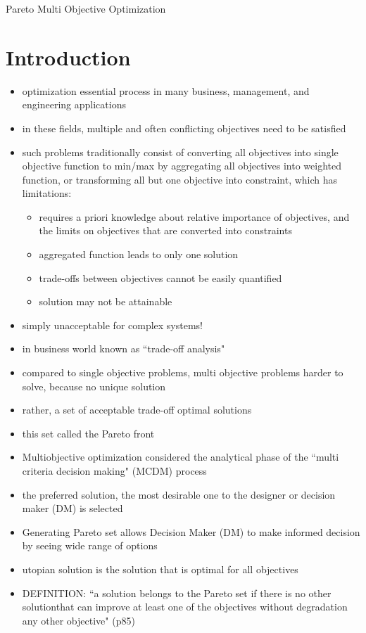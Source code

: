 \documentclass{article}
\begin{document}
\newpage
%
%
%
%
% 
%
%
%
{\LARGE Pareto Multi Objective Optimization}
\setcounter{section}{0}
\section{Introduction}
\begin{itemize}
\item optimization essential process in many business, management, and engineering applications
\item in these fields, multiple and often conflicting objectives need to be satisfied
\item such problems traditionally consist of converting all objectives into single objective function to min/max by aggregating all objectives into weighted function, or transforming all but one objective into constraint, which has limitations:
	\begin{itemize}
	\item requires a priori knowledge about relative importance of objectives, and the limits on objectives that are converted into constraints
	\item aggregated function leads to only one solution
	\item trade-offs between objectives cannot be easily quantified
	\item solution may not be attainable 
	\end{itemize}
\item simply unacceptable for complex systems!
\item in business world known as ``trade-off analysis"
\item compared to single objective problems, multi objective problems harder to solve, because no unique solution
\item rather, a set of acceptable trade-off optimal solutions
\item this set called the Pareto front
\item Multiobjective optimization considered the analytical phase of the ``multi criteria decision making" (MCDM) process
\item the preferred solution, the most desirable one to the designer or decision maker (DM) is selected
\item Generating Pareto set allows Decision Maker (DM) to make informed decision by seeing wide range of options
\item utopian solution is the solution that is optimal for all objectives
\item DEFINITION: ``a solution belongs to the Pareto set if there is no other solutionthat can improve at least one of the objectives without degradation any other objective" (p85)

\end{itemize}
\end{document}
